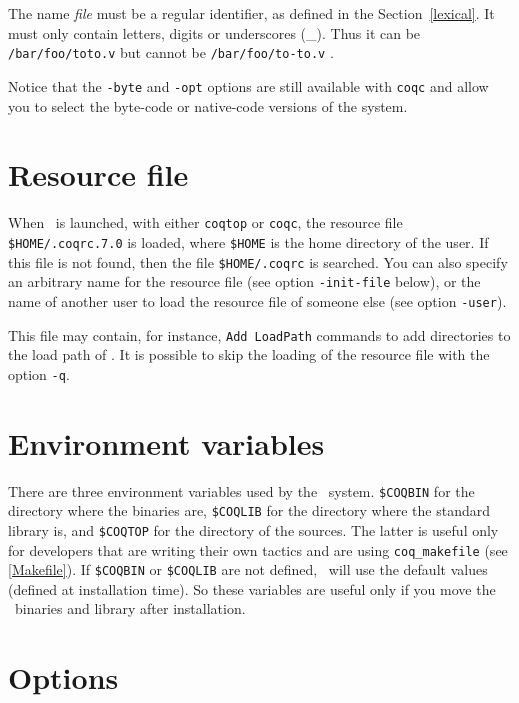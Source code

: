 \Warning The name {\em file} must be a regular {\Coq} identifier, as
defined in the Section~\ref{lexical}. It
must only contain letters, digits or underscores
(\_). Thus it can be \verb+/bar/foo/toto.v+ but cannot be
\verb+/bar/foo/to-to.v+ . 

Notice that the \verb!-byte! and \verb!-opt! options are still
available with \verb!coqc!  and allow you to select the byte-code or
native-code versions of the system.


\section[Resource file]{Resource file}

When \Coq\ is launched, with either {\tt coqtop} or {\tt coqc}, the
resource file \verb:$HOME/.coqrc.7.0: is loaded, where \verb:$HOME: is
the home directory of the user.  If this file is not found, then the
file \verb:$HOME/.coqrc: is searched. You can also specify an
arbitrary name for the resource file (see option \verb:-init-file:
below), or the name of another user to load the resource file of
someone else (see option \verb:-user:).

This file may contain, for instance, \verb:Add LoadPath: commands to add
directories to the load path of \Coq.
It is possible to skip the loading of the resource file with the
option \verb:-q:.

\section[Environment variables]{Environment variables\label{EnvVariables}
}

There are three environment variables used by the \Coq\ system.
\verb:$COQBIN: for the directory where the binaries are,
\verb:$COQLIB: for the directory where the standard library is, and 
\verb:$COQTOP: for the directory of the sources. The latter is useful
only for developers that are writing their own tactics and are using
\texttt{coq\_makefile} (see \ref{Makefile}). If \verb:$COQBIN: or
\verb:$COQLIB: are not defined, \Coq\ will use the default values
(defined at installation time). So these variables are useful only if
you move the \Coq\ binaries and library after installation.

\section[Options]{Options
\label{vmoption}}


